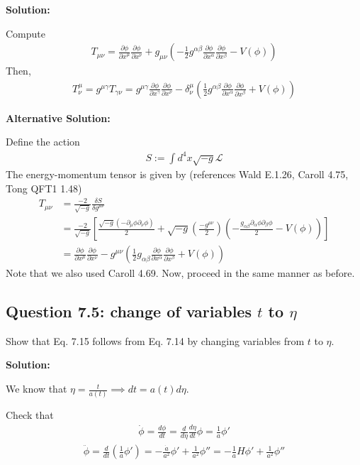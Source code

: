 \documentclass[11pt]{article}
\begin{document}
\textbf{Solution:}

Compute
\begin{align*}
    T_{\mu\nu} = \frac{\partial \phi}{\partial x^\mu} \frac{\partial \phi}{\partial x^\nu} + g_{\mu\nu} \left( -\frac{1}{2}g^{\alpha \beta} \frac{\partial \phi}{\partial x^\alpha} \frac{\partial \phi}{\partial x^\beta} - V(\phi)\right) 
\end{align*}
Then, 
\begin{align*}
    T^\mu_{\nu} = g^{\mu\gamma}T_{\gamma\nu} = g^{\mu\gamma} \frac{\partial \phi}{\partial x^\gamma} \frac{\partial \phi}{\partial x^\nu} - \delta^\mu_\nu \left( \frac{1}{2}g^{\alpha \beta} \frac{\partial \phi}{\partial x^\alpha} \frac{\partial \phi}{\partial x^\beta} + V(\phi)\right)
\end{align*}

\textbf{Alternative Solution:}

Define the action
\begin{align*}
    S := \int d^4 x \sqrt{-g} \mathcal{L}
\end{align*}
The energy-momentum tensor is given by (references Wald E.1.26, Caroll 4.75, Tong QFT1 1.48)
\begin{align*}
    T_{\mu\nu} &= \frac{-2}{\sqrt{-g}} \frac{\delta S}{\delta g^{\mu\nu}} \\
    &=  \frac{-2}{\sqrt{-g}} \left[ \frac{\sqrt{-g} (-\partial_\mu\phi\partial_\nu\phi)}{2} + \sqrt{-g} \left(\frac{-g^{\mu\nu}}{2}\right)\left(-\frac{g_{\alpha\beta} \partial_\alpha \phi \partial_\beta \phi}{2} - V(\phi) \right) \right] \\
    &= \frac{\partial \phi}{\partial x^\mu} \frac{\partial \phi}{\partial x^\nu} - g^{\mu\nu} \left(\frac{1}{2}g_{\alpha\beta} \frac{\partial \phi}{\partial x^\alpha} \frac{\partial \phi }{\partial x^\beta} + V(\phi)\right) 
\end{align*}
Note that we also used Caroll 4.69. Now, proceed in the same manner as before.

\subsection{Question 7.5: change of variables $t$ to $\eta$}
Show that Eq. 7.15 follows from Eq. 7.14 by changing variables from $t$ to $\eta$. 

\textbf{Solution:}

We know that $\eta = \frac{t}{a(t)} \implies dt = a(t) d\eta$. 

Check that 
\begin{align*}
    \dot{\phi} = \frac{d\phi}{dt} = \frac{d}{d\eta} \frac{d\eta}{dt} \phi = \frac{1}{a}\phi'
\end{align*}
\begin{align*}
    \ddot{\phi} = \frac{d}{dt} \left( \frac{1}{a}\phi'\right) = -\frac{\dot{a}}{a^2} \phi' + \frac{1}{a^2}\phi'' = -\frac{1}{a}H\phi' + \frac{1}{a^2}\phi''
\end{align*}
\end{document}

